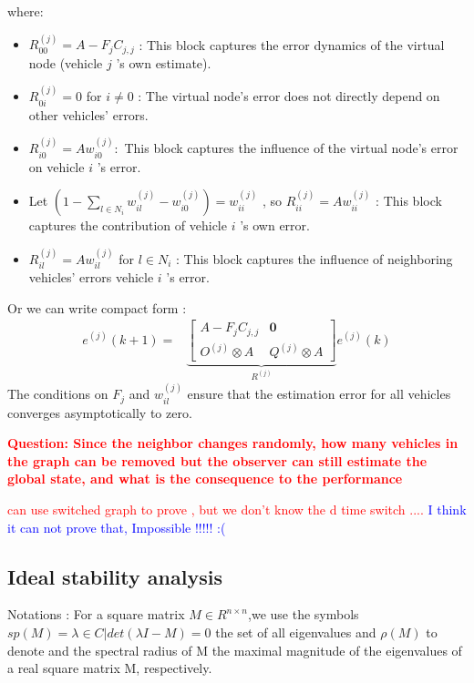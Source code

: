 \documentclass[letterpaper, 10pt, conference]{ieeeconf}  %
\begin{document}
where:
\begin{itemize}
    \item  $R_{00}^{(j)}=A-F_j C_{j, j}$ : This block captures the error dynamics of the virtual node (vehicle $j$ 's own estimate).
    \item $R_{0 i}^{(j)}=0$ for $i \neq 0$ : The virtual node's error does not directly depend on other vehicles' errors.
    \item $R_{i 0}^{(j)}=A w_{i 0}^{(j)}:$ This block captures the influence of the virtual node's error on vehicle $i$ 's error.
    \item Let $\left(1-\sum_{l \in N_i} w_{i l}^{(j)}-w_{i 0}^{(j)}\right) = w_{i i}^{(j)}$ 
    , so $R_{i i}^{(j)}=A w_{i i}^{(j)}$ : This block captures the contribution of vehicle $i$ 's own error. 
    \item $R_{i l}^{(j)}=A w_{i l}^{(j)}$ for $l \in N_i$ : This block captures the influence of neighboring vehicles' errors vehicle $i$ 's error.
\end{itemize}

Or we can write compact form : 
$$
\begin{aligned}
e^{(j)}(k+1)= & \underbrace{\left[\begin{array}{c|c}
A-F_j C_{j, j} & \mathbf{0} \\
\hline O^{(j)} \otimes A & Q^{(j)} \otimes A
\end{array}\right]}_{R^{(j)}} e^{(j)}(k) 
\end{aligned}
$$
The conditions on \( F_j \) and \( w_{il}^{(j)} \) ensure that the estimation error for all vehicles converges asymptotically to zero.

\textcolor{red}{\textbf{Question: Since the neighbor changes randomly, how many vehicles in the graph can be removed but the observer can still estimate the global state, and what is the consequence to the performance} }

\textcolor{red}{ can use switched graph to prove , but we don't know the  d time switch}
\textcolor{red}{....}
\textcolor{blue}{ I think it can not prove that, Impossible  !!!!! :(}

\subsection{Ideal stability analysis}
Notations : For a square matrix $M \in R^{n\times n}$,we use the symbols $sp(M)={\lambda \in C|det (\lambda I - M ) = 0}$ the set of all eigenvalues and $ \rho(M)$ to denote and the spectral radius of M the maximal magnitude of the eigenvalues of a real square matrix M, respectively.
\end{document}
